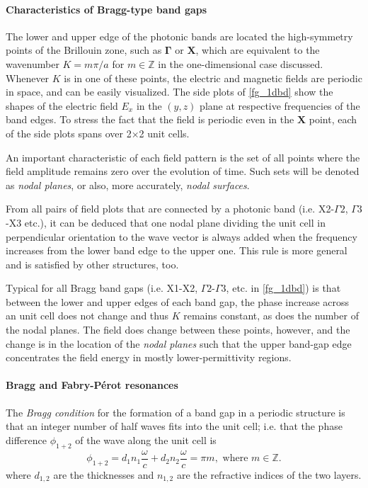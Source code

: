 \paragraph{Characteristics of Bragg-type band gaps}%
The lower and upper edge of the photonic bands are located the high-symmetry points of the Brillouin zone, such as $\mathbf{\Gamma}$ or $\mathbf{X}$, which are equivalent to the wavenumber $K=m\pi/a$ for $m\in\mathbb{Z}$ in the one-dimensional case discussed. Whenever $K$ is in one of these points, the electric and magnetic fields are periodic in space, and can be easily visualized. The side plots of \ref{fg_1dbd} show the shapes of the electric field $E_x$ in the $(y,z)$ plane at respective frequencies of the band edges. To stress the fact that the field is periodic even in the $\mathbf{X}$ point, each of the side plots spans over 2$\times$2 unit cells. 

An important characteristic of each field pattern is the set of all points where the field amplitude remains zero over the evolution of time. Such sets will be denoted as \textit{nodal planes}, or also, more accurately, \textit{nodal surfaces}.

From all pairs of field plots that are connected by a photonic band (i.e. X2-$\Gamma2$, $\Gamma3$-X3 etc.), it can be deduced that one nodal plane dividing the unit cell in perpendicular orientation to the wave vector is always added when the frequency increases from the lower band edge to the upper one. This rule is more general and is satisfied by other structures, too. 

Typical for all Bragg band gaps (i.e. X1-X2, $\Gamma2$-$\Gamma3$, etc. in \ref{fg_1dbd}) is that between the lower and upper edges of each band gap, the phase increase across an unit cell does not change and thus $K$ remains constant, as does the number of the nodal planes. The field does change between these points, however, and the change is in the location of the \textit{nodal planes} such that the upper band-gap edge concentrates the field energy in mostly lower-permittivity regions. 

\paragraph{Bragg and Fabry-Pérot resonances} %
The \textit{Bragg condition} for the formation of a band gap in a periodic structure is that an integer number of half waves fits into the unit cell; i.e. that the phase difference $\phi_{1+2}$ of the wave along the unit cell is 
\begin{equation} \phi_{1+2} = d_1 n_1 \frac{\omega}{c} + d_2 n_2 \frac{\omega}{c} = \pi m, \text{ where } m\in \mathbb{Z}. \label{eq_braggcond}\end{equation}
where $d_{1,2}$ are the thicknesses and $n_{1,2}$ are the refractive indices of the two layers.

